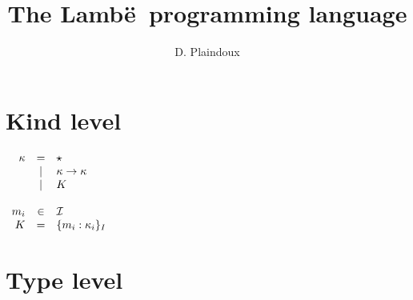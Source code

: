 \documentclass{article}[11pt]
\newcommand{\lambe}[0]{{\sf Lamb\"e~}}
\begin{document}
    \title{The \lambe programming language}
    \author{D. Plaindoux}

    \maketitle


    \section{Kind level}\label{sec:kind-level}

    \begin{math}
        \begin{array}{rcll}
            \kappa
            & =    & \star                     \\
            & \mid & \kappa \rightarrow \kappa \\
            & \mid & K                         \\
            \\
            m_i & \in & {\cal I} \\
            K & =                  & \{ m_i:\kappa_i \}_I \\
        \end{array}
    \end{math}


    \section{Type level}\label{sec:type-level}
\end{document}
